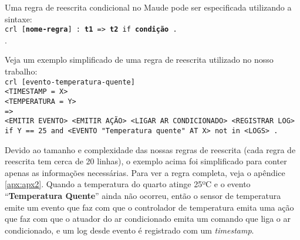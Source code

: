 \noindent
Uma regra de reescrita condicional no Maude pode ser especificada utilizando a sintaxe: \\
\texttt{crl [\textbf{nome-regra}] : \textbf{t1} => \textbf{t2} if \textbf{condição} . } \\
.

Veja um exemplo simplificado de uma regra de reescrita utilizado no nosso trabalho: \\
\texttt{crl [evento-temperatura-quente]} \\
\texttt{<TIMESTAMP = X>} \\
\texttt{<TEMPERATURA = Y>} \\
\texttt{=>} \\
\texttt{<EMITIR EVENTO> <EMITIR AÇÃO> <LIGAR AR CONDICIONADO> <REGISTRAR LOG>} \\
\texttt{if Y == 25 and <EVENTO "Temperatura quente"\ AT X> not in <LOGS> .}

Devido ao tamanho e complexidade das nossas regras de reescrita (cada regra de reescrita tem cerca de 20 linhas), o exemplo acima foi simplificado para conter apenas as informações necessárias. Para ver a regra completa, veja o apêndice \ref{apx:apx2}. Quando a temperatura do quarto atinge 25ºC e o evento ``\textbf{Temperatura Quente}'' ainda não ocorreu, então o sensor de temperatura emite um evento que faz com que o controlador de temperatura emita uma ação que faz com que o atuador do ar condicionado emita um comando que liga o ar condicionado, e um log desde evento é registrado com um \textit{timestamp}.